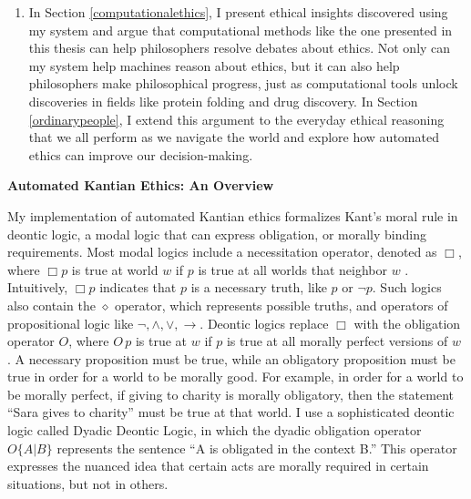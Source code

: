 \begin{isabellebody}
\begin{isamarkuptext}
\begin{enumerate}
\item In Section \ref{computationalethics}, I present ethical insights discovered using my system and argue that
computational methods like the one presented in this thesis can help philosophers resolve debates about ethics.
Not only can my system help machines reason about ethics, but it can also help philosophers make philosophical
progress, just as computational tools unlock discoveries in fields like protein folding and drug discovery.
In Section \ref{ordinarypeople}, I extend this argument to the everyday ethical reasoning that we all
perform as we navigate the world and explore how automated ethics can improve our decision-making. 
\end{enumerate}%
\end{isamarkuptext}\isamarkuptrue%
%
\begin{isamarkuptext}%
\noindent \textbf{Automated Kantian Ethics: An Overview}

\medskip 

My implementation of automated Kantian ethics formalizes Kant's moral rule
in deontic logic, a modal logic that can express obligation, or morally binding requirements. Most modal 
logics include a necessitation operator, denoted as $\Box$, where
$\Box p$ is true at world $w$ if $p$ is true at all worlds that neighbor $w$ \citep{cresswell}. Intuitively, 
$\Box p$ indicates that $p$ is a necessary truth, like $p$ or $\neg p$. Such 
logics also contain the $\diamond$ operator, which represents possible truths, and operators of 
propositional logic like $\neg, \wedge, \vee, \rightarrow$. Deontic logics
replace $\Box$ with the obligation operator $O$, where $O \, p$ is true at $w$ 
if $p$ is true at all morally perfect versions of $w$ \citep{sep-logic-deontic}. A necessary 
proposition must be true, while an obligatory proposition must be true in order for a world to be morally good.
For example, in order for a world to be morally perfect, if giving to charity is morally obligatory, then
the statement ``Sara gives to charity'' must be true at that world. I use a sophisticated deontic logic 
called Dyadic Deontic Logic, in which the dyadic obligation operator $O\{A \vert B\}$ represents the 
sentence ``A is obligated in the context B.'' This operator expresses the nuanced idea
that certain acts are morally required in certain situations, but not in others.


\end{isamarkuptext}
\end{isabellebody}
